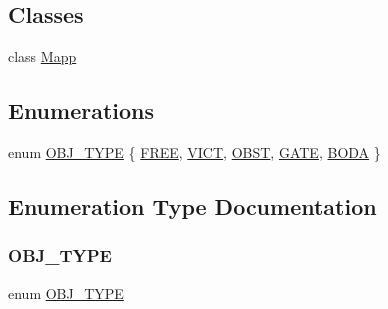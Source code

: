 \subsection*{Classes}
\begin{DoxyCompactItemize}
\item 
class \mbox{\hyperlink{class_mapp}{Mapp}}
\end{DoxyCompactItemize}
\subsection*{Enumerations}
\begin{DoxyCompactItemize}
\item 
enum \mbox{\hyperlink{map_8hh_a714b9c2c276fbae637fee36453d9121e}{O\+B\+J\+\_\+\+T\+Y\+PE}} \{ \newline
\mbox{\hyperlink{map_8hh_a714b9c2c276fbae637fee36453d9121eacc62d1576546f3245237e1b232d838b6}{F\+R\+EE}}, 
\mbox{\hyperlink{map_8hh_a714b9c2c276fbae637fee36453d9121ea71a79ec3ed4c3f42f62a3d9998424be7}{V\+I\+CT}}, 
\mbox{\hyperlink{map_8hh_a714b9c2c276fbae637fee36453d9121ea9bfb772b98998217b3d7caf5a94b9938}{O\+B\+ST}}, 
\mbox{\hyperlink{map_8hh_a714b9c2c276fbae637fee36453d9121eac00a9212e2a45c125c4e3ca32bbfc0f8}{G\+A\+TE}}, 
\newline
\mbox{\hyperlink{map_8hh_a714b9c2c276fbae637fee36453d9121eae00209173a2bee1d1552d2e3b61b1a36}{B\+O\+DA}}
 \}
\end{DoxyCompactItemize}


\subsection{Enumeration Type Documentation}
\mbox{\label{map_8hh_a714b9c2c276fbae637fee36453d9121e}} 
\subsubsection{\texorpdfstring{OBJ\_TYPE}{OBJ\_TYPE}}
{\footnotesize\ttfamily enum \mbox{\hyperlink{map_8hh_a714b9c2c276fbae637fee36453d9121e}{O\+B\+J\+\_\+\+T\+Y\+PE}}}

